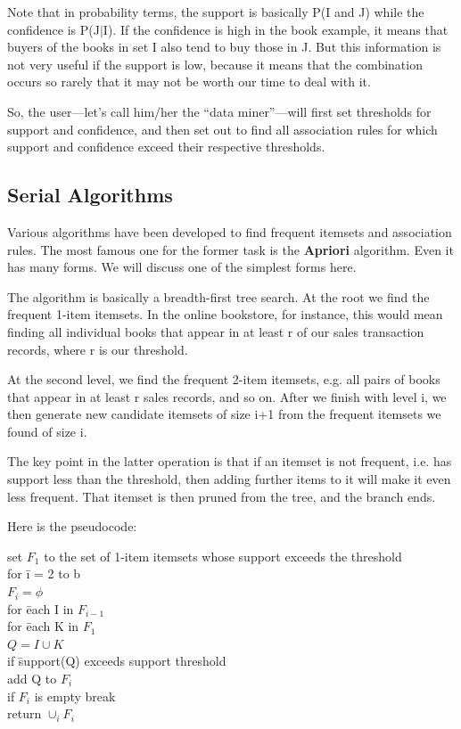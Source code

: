 Note that in probability terms, the support is basically P(I and J)
while the confidence is P(J$|$I).  If the confidence is high in the book
example, it means that buyers of the books in set I also tend to buy
those in J.  But this information is not very useful if the support is
low, because it means that the combination occurs so rarely that it may
not be worth our time to deal with it.

So, the user---let's call him/her the ``data miner''---will first set
thresholds for support and confidence, and then set out to find all
association rules for which support and confidence exceed their
respective thresholds.

\subsection{Serial Algorithms}

Various algorithms have been developed to find frequent itemsets and
association rules.  The most famous one for the former task is the {\bf
Apriori} algorithm.  Even it has many forms.  We will discuss one of the
simplest forms here.

The algorithm is basically a breadth-first tree search.  At the root we
find the frequent 1-item itemsets.  In the online bookstore, for
instance, this would mean finding all individual books that appear in at
least r of our sales transaction records, where r is our threshold.

At the second level, we find the frequent 2-item itemsets, e.g. all
pairs of books that appear in at least r sales records, and so on.
After we finish with level i, we then generate new candidate itemsets of
size i+1 from the frequent itemsets we found of size i.

The key point in the latter operation is that if an itemset is not
frequent, i.e. has support less than the threshold, then adding further
items to it will make it even less frequent.  That itemset is then
pruned from the tree, and the branch ends.

Here is the pseudocode:

\begin{tabbing}
set $F_1$ to the set of 1-item itemsets whose support exceeds the
threshold \\
for \=  i = 2 to b \\
  \> $F_{i} = \phi$ \\
  \> for \= each I in $F_{i-1}$ \\
  \> \> for \= each K in $F_1$ \\
  \> \> \> $Q = I \cup K$ \\
  \> \> \> if \= support(Q) exceeds support threshold \\
  \> \> \> \> add Q to $F_{i}$ \\
  \> if $F_{i}$ is empty break \\
return $\cup_i F_i$
\end{tabbing}

